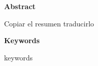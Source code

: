 
\newpage

\thispagestyle{empty}

\begin{center}

{\bf \Huge Abstract}

  \end{center}
\vspace{1cm}

Copiar el resumen traducirlo

\vspace{1cm}

\begin{center}

{\bf \Large Keywords}

   \end{center}

   \vspace{0.5cm}
   
   keywords
   


